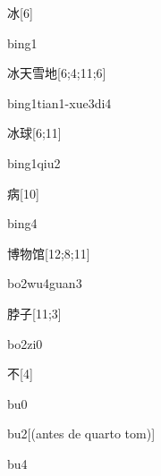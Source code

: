 \begin{verbete}[bing1]{冰}[6]
\begin{pronuncia}{bing1}
\end{pronuncia}
\end{verbete}

\begin{verbete}{冰天雪地}[6;4;11;6]
\begin{pronuncia}[\\]{bing1tian1-xue3di4}
\end{pronuncia}
\end{verbete}

\begin{verbete}{冰球}[6;11]
\begin{pronuncia}{bing1qiu2}
\end{pronuncia}
\end{verbete}

\begin{verbete}[bing4]{病}[10]
\begin{pronuncia}{bing4}
\end{pronuncia}
\end{verbete}

\begin{verbete}[bo2wu4guan3]{博物馆}[12;8;11]
\begin{pronuncia}{bo2wu4guan3}
\end{pronuncia}
\end{verbete}

\begin{verbete}[bo2zi0]{脖子}[11;3]
\begin{pronuncia}{bo2zi0}
\end{pronuncia}
\end{verbete}

\begin{verbete}[bu0]{不}[4]
\begin{pronuncia}{bu0}
\end{pronuncia}
\begin{pronuncia}{bu2}[(antes de quarto tom)]
\end{pronuncia}
\begin{pronuncia}{bu4}
\end{pronuncia}
\end{verbete}

